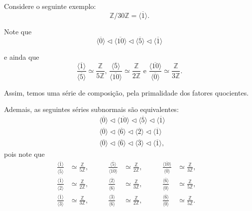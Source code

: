 \documentclass[11pt,openany]{book}
\newcommand{\gen}[1]{\ensuremath{\langle #1\rangle}}
\newenvironment{novo}{
    \color{red}
}{}
\begin{document}
\begin{novo}
Considere o seguinte exemplo:
$$\mathbb{Z}/30\mathbb{Z} = \gen{\overline{1}}.$$

Note que
\begin{equation*}
    \gen{\overline{0}} \triangleleft \gen{\overline{10}} \triangleleft \gen{\overline{5}} \triangleleft \gen{\overline{1}}
\end{equation*}

e ainda que
\begin{equation*}
    \frac{\gen{\overline{1}}}{\gen{\overline{5}}} \simeq \frac{\mathbb{Z}}{5\mathbb{Z}}, \, \frac{\gen{\overline{5}}}{\gen{\overline{10}}} \simeq \frac{\mathbb{Z}}{2\mathbb{Z}} \text{ e } \frac{\gen{\overline{10}}}{\gen{\overline{0}}} \simeq \frac{\mathbb{Z}}{3\mathbb{Z}}.
\end{equation*}

Assim, temos uma série de composição, pela primalidade dos fatores quocientes.

Ademais, as seguintes séries subnormais são equivalentes:
\begin{align*}
     &\gen{\overline{0}} \triangleleft \gen{\overline{10}} \triangleleft \gen{\overline{5}} \triangleleft \gen{\overline{1}}\\
     &\gen{\overline{0}} \triangleleft \gen{\overline{6}} \triangleleft \gen{\overline{2}} \triangleleft \gen{\overline{1}}\\
     &\gen{\overline{0}} \triangleleft \gen{\overline{6}} \triangleleft \gen{\overline{3}} \triangleleft \gen{\overline{1}},
\end{align*}
pois note que 
\begin{align*}
    \frac{\gen{\overline{1}}}{\gen{\overline{5}}} &\simeq \frac{\mathbb{Z}}{5\mathbb{Z}},&\qquad
    \frac{\gen{\overline{5}}}{\gen{\overline{10}}} &\simeq \frac{\mathbb{Z}}{2\mathbb{Z}},&\qquad
    \frac{\gen{\overline{10}}}{\gen{\overline{0}}} &\simeq \frac{\mathbb{Z}}{3\mathbb{Z}}, &\\
    \frac{\gen{\overline{1}}}{\gen{\overline{2}}} &\simeq \frac{\mathbb{Z}}{2\mathbb{Z}},&\qquad
    \frac{\gen{\overline{2}}}{\gen{\overline{6}}} &\simeq \frac{\mathbb{Z}}{3\mathbb{Z}},&\qquad
    \frac{\gen{\overline{6}}}{\gen{\overline{0}}} &\simeq \frac{\mathbb{Z}}{5\mathbb{Z}}, &\\
    \frac{\gen{\overline{1}}}{\gen{\overline{3}}} &\simeq \frac{\mathbb{Z}}{3\mathbb{Z}},&\qquad
    \frac{\gen{\overline{3}}}{\gen{\overline{6}}} &\simeq \frac{\mathbb{Z}}{2\mathbb{Z}},&\qquad
    \frac{\gen{\overline{6}}}{\gen{\overline{0}}} &\simeq \frac{\mathbb{Z}}{5\mathbb{Z}} .&
\end{align*}
\end{novo}
\end{document}
